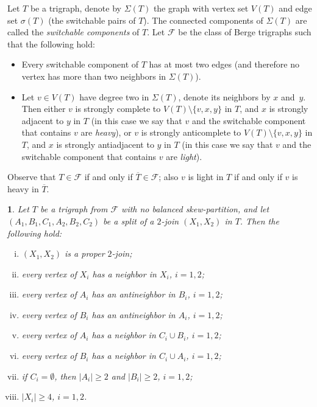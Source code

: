 \documentclass[11 pt] {article}
\newtheorem{theorem}{}[section]
\begin{document}
Let $T$ be a trigraph, denote by $\Sigma(T)$ the graph with vertex set
$V(T)$ and edge set $\sigma(T)$ (the switchable pairs of $T$).  The
connected components of $\Sigma(T)$ are called the \emph{switchable
  components} of $T$.  Let $\mathcal{F}$ be the class of Berge
trigraphs such that the following hold:
\begin{itemize}
\item Every switchable component of $T$ has at most two edges (and
therefore no vertex has more than two neighbors in $\Sigma(T)$).
\item Let $v \in V(T)$ have degree two in $\Sigma(T)$, denote its
neighbors by $x$ and~$y$. Then either $v$ is strongly complete to
$V(T) \setminus \{v, x, y\}$ in $T$, and $x$ is strongly adjacent to
$y$ in $T$ (in this case we say that $v$ and the switchable component
that contains $v$ are {\em heavy}), or $v$ is
strongly anticomplete to $V(T) \setminus \{v, x, y\}$ in $T$, and $x$
is strongly antiadjacent to $y$ in $T$ (in this case we say that $v$
and the switchable component that contains $v$ are {\em light}).
\end{itemize} 

Observe that $T\in \mathcal{F}$ if and only if $\overline{T}\in
\mathcal{F}$; also $v$ is light in $T$ if and only if $v$ is heavy in
$\overline{T}$. 



\begin{theorem}\label{2joinform}
  Let $T$ be a trigraph from $\mathcal F$ with no balanced
  skew-partition, and let $(A_1,B_1,C_1,A_2,B_2,C_2)$ be a split of a
  $2$-join $(X_1,X_2)$ in $T$. Then the following hold:
 \begin{enumerate}[(i)]
 \item $(X_1,X_2)$ is a proper $2$-join;
 \item every vertex of $X_i$ has a neighbor in $X_i$, $i=1,2$;
 \item every vertex of $A_i$ has an antineighbor in $B_i$, $i=1,2$;
 \item every vertex of $B_i$ has an antineighbor in $A_i$, $i=1,2$;
 \item every vertex of $A_i$ has a neighbor in $C_i\cup B_i$,
  $i=1,2$;
 \item every vertex of $B_i$ has a neighbor in $C_i\cup A_i$,
  $i=1,2$;
\item if $C_i = \emptyset$, then $|A_i| \geq 2$ and $|B_i| \geq 2$,
  $i=1,2$;
\item \label{size}$|X_i| \geq 4$, $i=1,2$.
 \end{enumerate}
\end{theorem}
\end{document}

